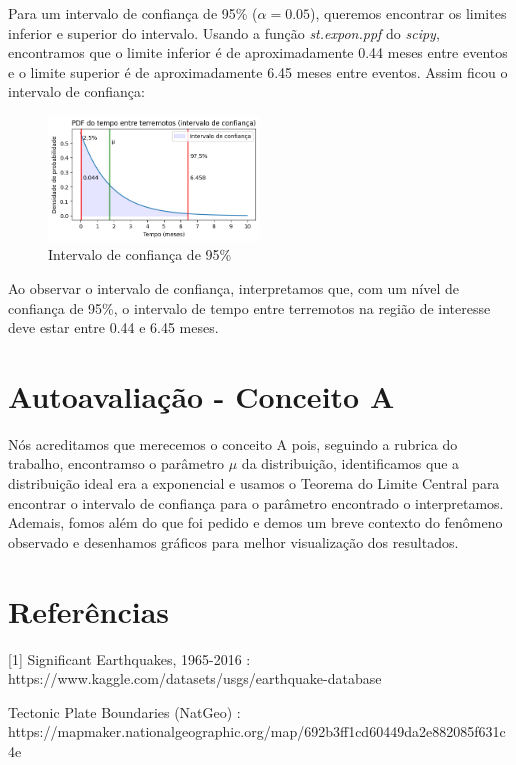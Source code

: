 \documentclass{article}
\begin{document}
    Para um intervalo de confiança de 95\% ($\alpha = 0.05$), queremos encontrar os limites inferior e superior do intervalo.
    Usando a função \textit{st.expon.ppf} do \textit{scipy}, encontramos que o limite inferior é de aproximadamente 0.44 meses
    entre eventos e o limite superior é de aproximadamente 6.45 meses entre eventos. Assim ficou o intervalo de confiança:

    \begin{figure}[h]
        \centering
        \includegraphics[width=0.5\textwidth]{pdf_expon_terremotos_IC.png}
        \caption{Intervalo de confiança de 95\%}
    \end{figure}

    Ao observar o intervalo de confiança, interpretamos que, com um nível de confiança de 95\%, o intervalo de tempo entre terremotos
    na região de interesse deve estar entre 0.44 e 6.45 meses.\\


    \section*{Autoavaliação - Conceito A}

    Nós acreditamos que merecemos o conceito A pois, seguindo a rubrica do trabalho, encontramso o parâmetro $\mu$ da distribuição,
    identificamos que a distribuição ideal era a exponencial e usamos o Teorema do Limite Central para encontrar o intervalo de confiança
    para o parâmetro encontrado o interpretamos. Ademais, fomos além do que foi pedido e demos um breve contexto do fenômeno observado e desenhamos
    gráficos para melhor visualização dos resultados. \\


    \section*{Referências}

    [1] Significant Earthquakes, 1965-2016 : https://www.kaggle.com/datasets/usgs/earthquake-database
    \

    \noindent[2] Tectonic Plate Boundaries (NatGeo) : https://mapmaker.nationalgeographic.org/map/692b3ff1cd60449da2e882085f631c4e
\end{document}
